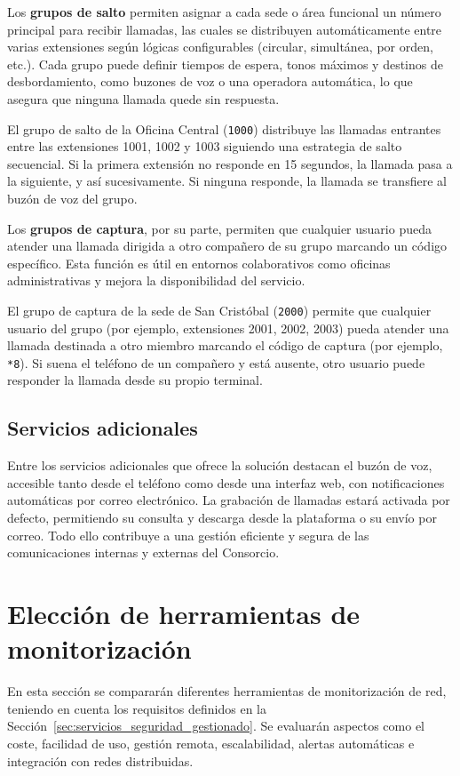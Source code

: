 \vspace{0.5cm}
Los \textbf{grupos de salto} permiten asignar a cada sede o área funcional un número principal para recibir llamadas, las cuales se distribuyen automáticamente entre varias extensiones según lógicas configurables (circular, simultánea, por orden, etc.). Cada grupo puede definir tiempos de espera, tonos máximos y destinos de desbordamiento, como buzones de voz o una operadora automática, lo que asegura que ninguna llamada quede sin respuesta.

\vspace{0.3cm}
\noindent
El grupo de salto de la Oficina Central (\texttt{1000}) distribuye las llamadas entrantes entre las extensiones 1001, 1002 y 1003 siguiendo una estrategia de salto secuencial. Si la primera extensión no responde en 15 segundos, la llamada pasa a la siguiente, y así sucesivamente. Si ninguna responde, la llamada se transfiere al buzón de voz del grupo.

\vspace{0.5cm}
Los \textbf{grupos de captura}, por su parte, permiten que cualquier usuario pueda atender una llamada dirigida a otro compañero de su grupo marcando un código específico. Esta función es útil en entornos colaborativos como oficinas administrativas y mejora la disponibilidad del servicio.

\vspace{0.3cm}
\noindent
El grupo de captura de la sede de San Cristóbal (\texttt{2000}) permite que cualquier usuario del grupo (por ejemplo, extensiones 2001, 2002, 2003) pueda atender una llamada destinada a otro miembro marcando el código de captura (por ejemplo, \texttt{*8}). Si suena el teléfono de un compañero y está ausente, otro usuario puede responder la llamada desde su propio terminal.

\subsection{Servicios adicionales}
Entre los servicios adicionales que ofrece la solución destacan el buzón de voz, accesible tanto desde el teléfono como desde una interfaz web, con notificaciones automáticas por correo electrónico. La grabación de llamadas estará activada por defecto, permitiendo su consulta y descarga desde la plataforma o su envío por correo. Todo ello contribuye a una gestión eficiente y segura de las comunicaciones internas y externas del Consorcio.

\section{Elección de herramientas de monitorización}
En esta sección se compararán diferentes herramientas de monitorización de red, teniendo en cuenta los requisitos definidos en la Sección~\ref{sec:servicios_seguridad_gestionado}. Se evaluarán aspectos como el coste, facilidad de uso, gestión remota, escalabilidad, alertas automáticas e integración con redes distribuidas.

